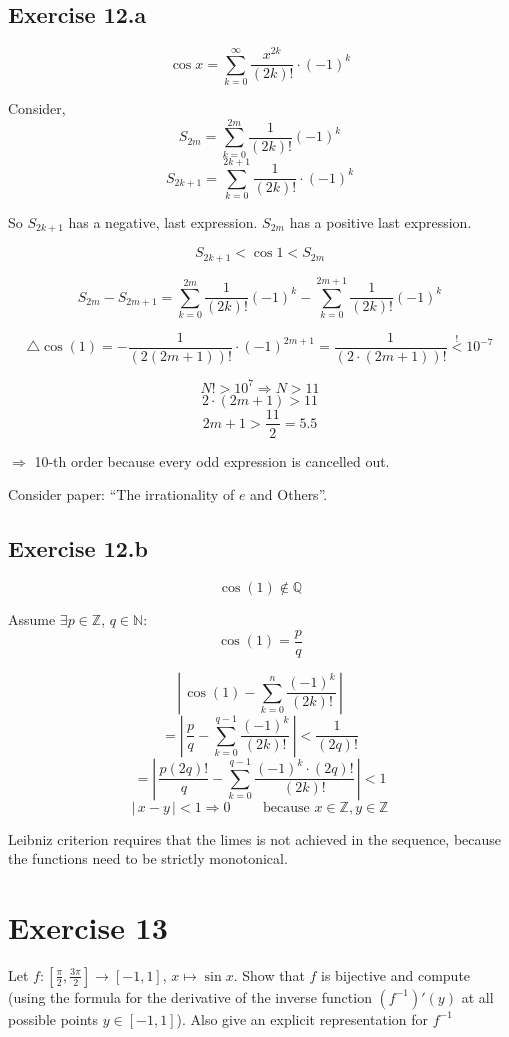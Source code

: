 \documentclass[a4paper]{article}
\theoremstyle{definition}
\newcommand\abs[1]{\left|\,#1\,\right|}
\begin{document}
\subsection{Exercise 12.a}
%
\[ \cos{x} = \sum_{k=0}^\infty \frac{x^{2k}}{(2k)!} \cdot (-1)^k \]

Consider,
\[ S_{2m} = \sum_{k=0}^{2m} \frac{1}{(2k)!} (-1)^k \]
\[ S_{2k+1} = \sum_{k=0}^{2k+1} \frac{1}{(2k)!} \cdot (-1)^k \]

So $S_{2k+1}$ has a negative, last expression. $S_{2m}$ has a positive last expression.

\[ S_{2k+1} < \cos{1} < S_{2m} \]

\[ S_{2m} - S_{2m+1} = \sum_{k=0}^{2m} \frac{1}{(2k)!} (-1)^k - \sum_{k=0}^{2m+1} \frac{1}{(2k)!} (-1)^k \]

\[ \triangle \cos(1) = -\frac{1}{(2(2m+1))!} \cdot (-1)^{2m+1} = \frac{1}{(2 \cdot (2m + 1))!} \stackrel{!}{<} 10^{-7} \]

\[ N! > 10^7 \Rightarrow N > 11 \]
\[ 2 \cdot (2m + 1) > 11 \]
\[ 2m + 1 > \frac{11}{2} = 5.5 \]

$\Rightarrow$ 10-th order because every odd expression is cancelled out.

Consider paper: ``The irrationality of $e$ and Others''.

\subsection{Exercise 12.b}
\[
  \cos(1) \not\in \mathbb Q
\]

Assume $\exists p \in \mathbb Z$, $q \in \mathbb N$:
\[ \cos(1) = \frac{p}{q} \]

\[ \abs{\cos(1) - \sum_{k=0}^n \frac{(-1)^k}{(2k)!}} \]
\[ = \abs{\frac pq - \sum_{k=0}^{q-1} \frac{(-1)^k}{(2k)!}} < \frac{1}{(2q)!} \]
\[ = \abs{\frac{p (2q)!}{q} - \sum_{k=0}^{q-1} \frac{(-1)^k \cdot (2q)!}{(2k)!}} < 1 \]
\[ \abs{x - y} < 1 \Rightarrow 0 \qquad \text{ because } x \in \mathbb Z, y \in \mathbb Z \]

Leibniz criterion requires that the limes is not achieved in the sequence,
because the functions need to be strictly monotonical.

\section{Exercise 13}
\begin{ex}
  Let $f: [\frac\pi2, \frac{3\pi}2] \to [-1,1]$, $x \mapsto \sin{x}$.
  Show that $f$ is bijective and compute (using the formula for the derivative
  of the inverse function $(f^{-1})'(y)$ at all possible points $y \in [-1,1]$).
  Also give an explicit representation for $f^{-1}$
\end{ex}
\end{document}
